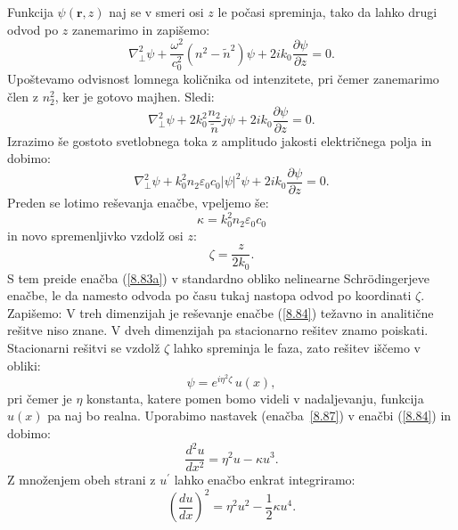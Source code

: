 Funkcija $\psi(\mathbf{r},z)$ naj se v smeri osi $z$ le počasi spreminja, tako da lahko
drugi odvod po $z$ zanemarimo in zapišemo: 
\begin{equation}
\nabla_{\bot}^{2}\psi+\frac{\omega^{2}}{c_0^{2}}(n^{2}-\tilde{n}^{2})\psi+2ik_{0}
\frac{\partial\psi}{\partial z}=0.
\label{8.82}
\end{equation}
Upoštevamo odvisnost lomnega količnika od intenzitete, pri čemer
zanemarimo člen z $n_{2}^{2}$, ker je gotovo majhen. Sledi:
\begin{equation}
\nabla_{\bot}^{2}\psi+2k_{0}^{2}\frac{n_{2}}{\tilde{n}}j\psi+2ik_{0}\frac{\partial\psi}{\partial z}=0.
\label{8.83}
\end{equation}
Izrazimo še gostoto svetlobnega toka z amplitudo jakosti električnega polja in dobimo:
\begin{equation}
\nabla_{\bot}^{2}\psi+
k_{0}^{2} n_2 \varepsilon_0 c_0 |\psi|^2 \psi+
2ik_{0}\frac{\partial\psi}{\partial z}=0.
\label{8.83a}
\end{equation}
Preden se lotimo reševanja enačbe, vpeljemo še:
\begin{equation}
\kappa=k_{0}^{2} n_2 \varepsilon_0 c_0
\end{equation}
 in novo spremenljivko vzdolž osi $z$:
\begin{equation}
\zeta=\frac{z}{2k_{0}}.
\end{equation}
 S tem preide enačba (\ref{8.83a}) v standardno obliko nelinearne Schr\"odingerjeve
enačbe, le da namesto odvoda po času tukaj nastopa odvod po koordinati $\zeta$. Zapišemo:
V treh dimenzijah je reševanje enačbe (\ref{8.84}) težavno in analitične
rešitve niso znane. V dveh dimenzijah pa stacionarno rešitev znamo
poiskati. Stacionarni rešitvi se vzdolž $\zeta$ lahko spreminja le faza, zato
rešitev iščemo v obliki:
\begin{equation}
\psi=e^{i\eta^{2}\zeta}\, u(x),
\label{8.87}
\end{equation}
pri čemer je $\eta$ konstanta, katere pomen bomo videli v nadaljevanju, 
 funkcija $u(x)$ pa naj bo realna. 
Uporabimo nastavek (enačba~\ref{8.87}) v enačbi (\ref{8.84}) in dobimo:
\begin{equation}
\frac{d^{2}u}{dx^{2}}=\eta^{2}u-\kappa u^{3}.
\end{equation}
 Z množenjem obeh strani z $u^{\prime}$ lahko enačbo enkrat integriramo:
\begin{equation}
\left(\frac{du}{dx}\right)^{2}=\eta^{2}u^{2}-\frac{1}{2}\kappa u^{4}.
\end{equation}
